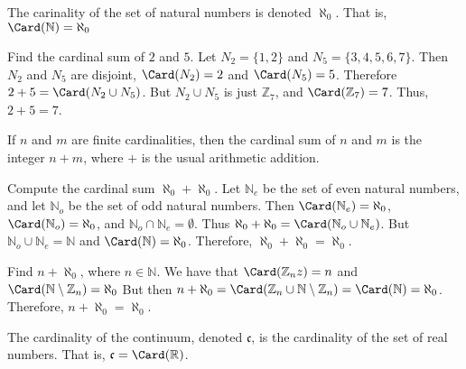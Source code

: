 \documentclass[crop=false,class=article,oneside]{standalone}
\begin{document}
        \begin{notation}
            The carinality of the set of natural numbers
            is denoted $\aleph_{0}$. That is,
            $\Card(\mathbb{N})=\aleph_{0}$
        \end{notation}
        \begin{example}
            Find the cardinal sum of $2$ and $5$. Let
            $N_{2}=\{1,2\}$ and $N_{5}=\{3,4,5,6,7\}$.
            Then $N_{2}$ and $N_{5}$ are disjoint,
            $\Card(N_{2})=2$ and $\Card(N_{5})=5$.
            Therefore $2+5=\Card(N_{2}\cup{N_{5}})$.
            But ${N_{2}}\cup{N_{5}}$ is just $\mathbb{Z}_{7}$,
            and $\Card(\mathbb{Z}_{7})=7$. Thus, $2+5=7$.
        \end{example}
        \begin{theorem*}
            If $n$ and $m$ are finite cardinalities,
            then the cardinal sum of $n$ and $m$ is the
            integer $n+m$, where $+$ is the usual
            arithmetic addition.
        \end{theorem*}
        \begin{example}
            Compute the cardinal sum
            $\aleph_{0}+\aleph_{0}$. Let
            $\mathbb{N}_{e}$ be the set of even natural
            numbers, and let $\mathbb{N}_{o}$ be the set
            of odd natural numbers. Then
            $\Card(\mathbb{N}_{e})=\aleph_{0}$,
            $\Card(\mathbb{N}_{o})=\aleph_{0}$, and
            ${\mathbb{N}_{o}}\cap{\mathbb{N}_{e}}=\emptyset$.
            Thus
            $\aleph_{0}+\aleph_{0}%
             =\Card({\mathbb{N}_{o}}\cup{\mathbb{N}_{e}})$.
            But
            ${\mathbb{N}_{o}}\cup{\mathbb{N}_{e}}%
             =\mathbb{N}$ and $\Card(\mathbb{N})=\aleph_{0}$.
            Therefore, $\aleph_{0}+\aleph_{0}=\aleph_{0}$.
        \end{example}
        \begin{example}
            Find $n+\aleph_{0}$, where $n\in\mathbb{N}$.
            We have that
            $\Card(\mathbb{Z}_{n}z)=n$ and
            $\Card(\mathbb{N}\setminus\mathbb{Z}_{n})%
             =\aleph_{0}$
            But then
            $n+\aleph_{0}=%
             \Card(\mathbb{Z}_{n}\cup%
             \mathbb{N}\setminus\mathbb{Z}_{n})%
             =\Card(\mathbb{N})=\aleph_{0}$.
            Therefore, $n+\aleph_{0}=\aleph_{0}$.
        \end{example}
        \begin{definition}
            The cardinality of the continuum,
            denoted $\mathfrak{c}$, is the
            cardinality of the set of real numbers.
            That is, $\mathfrak{c}=\Card(\mathbb{R})$.
        \end{definition}
\end{document}
